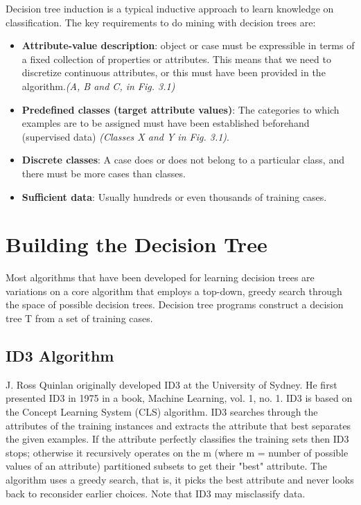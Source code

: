 \documentclass[12pt]{report}
\begin{document}
Decision tree induction is a typical inductive approach to learn knowledge on classification. The key requirements to do mining with decision trees are:
\begin{itemize}
\item{\textbf{Attribute-value description}: object or case must be expressible in terms of a fixed collection of properties or attributes. This means that we need to discretize continuous attributes, or this must have been provided in the algorithm.\textit{(A, B and C, in Fig. 3.1)}}
\item{\textbf{Predefined classes (target attribute values)}: The categories to which examples are to be assigned must have been established beforehand (supervised data) \textit{(Classes X and Y in Fig. 3.1)}.}
\item{\textbf{Discrete classes}: A case does or does not belong to a particular class, and there must be more cases than classes.}
\item{\textbf{Sufficient data}: Usually hundreds or even thousands of training cases.}

\end{itemize}



\section{Building the Decision Tree}

Most algorithms that have been developed for learning decision trees are variations on a core algorithm that employs a top-down, greedy search through the space of possible decision trees. Decision tree programs construct a decision tree T from a set of training cases.


\subsection{ID3 Algorithm}
J. Ross Quinlan originally developed ID3 at the University of Sydney. He first presented ID3 in 1975 in a book, Machine Learning, vol. 1, no. 1. ID3 is based on the Concept Learning System (CLS) algorithm. ID3 searches through the attributes of the training instances and extracts the attribute that best separates the given examples. If the attribute perfectly classifies the training sets then ID3 stops; otherwise it recursively operates on the m (where m = number of possible values of an attribute) partitioned subsets to get their "best" attribute. The algorithm uses a greedy search, that is, it picks the best attribute and never looks back to reconsider earlier choices. Note that ID3 may misclassify data. 
\end{document}
